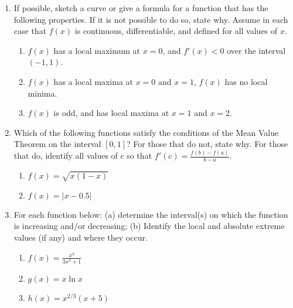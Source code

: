 \begin{enumerate}
	\item If possible, sketch a curve or give a formula for a function that has the following properties. If it is not possible to do so, state why. Assume in each case that $f(x)$ is continuous, differentiable, and defined for all values of $x$. 
    
    \begin{enumerate}
        \item $f(x)$ has a local maximum at $x=0$, and $f'(x)<0$ over the interval $(-1,1)$. 
        \item $f(x)$ has a local maxima at $x=0$ and $x=1$, $f(x)$ has no local minima. 
        \item $f(x)$ is odd, and has local maxima at $x=1$ and $x=2$.
    \end{enumerate}
    
	\item Which of the following functions satisfy the conditions of the 
Mean Value Theorem on the interval $[0,1]$? For those that do not, state why. For those that do, identify all values of $c$ so that $f'(c)=\frac{f(b)-f(a)}{b-a}$. 

	\begin{enumerate}
    	\item $\displaystyle f(x)=\sqrt{x(1-x)}$
        \item $\displaystyle f(x)=|x-0.5|$
    \end{enumerate}
    
	\item For each function below: (a) determine the interval(s) on which the 
function is increasing and/or decreasing; (b) Identify the local and 
absolute extreme values (if any) and where they occur. 
	\begin{enumerate} 
    	\item $\displaystyle f(x)=\frac{x^3}{3x^2+1}$
        \item $\displaystyle g(x)=x\ln x$
        \item $\displaystyle h(x)=x^{2/3}(x+5)$
    \end{enumerate} 



\end{enumerate}